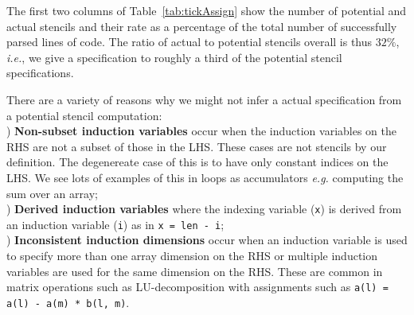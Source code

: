 \documentclass[9pt]{sigplanconf}
\theoremstyle{definition}
\newcommand{\ie}{\emph{i.e.}}
\newcommand{\eg}{\emph{e.g.}}
\begin{document}
The first two columns of Table~\ref{tab:tickAssign} show the number
of potential and actual stencils and their rate as a percentage of the
total number of successfully parsed lines of code. The ratio of
actual to potential stencils overall is thus $32\%$, \ie{}, we give
a specification to roughly a third of the potential stencil specifications.

There are a variety of reasons why we might not infer a actual specification from a potential
stencil computation: \\
) \textbf{Non-subset induction variables} occur when the
induction variables on the RHS are not a subset of those in the LHS. These
cases are not stencils by our definition. The degenereate case of this
is to have only constant indices on the LHS. We see lots of examples
of this in loops as accumulators \eg{} computing the sum over an array; \\
) \textbf{Derived induction variables} where the
indexing variable (\texttt{x}) is derived from an
induction variable (\texttt{i}) as in
\texttt{x = len - i};  \\
) \textbf{Inconsistent induction dimensions} occur when
an induction variable is used to specify more than one array dimension
on the RHS or multiple induction variables are used for the same
dimension on the RHS. These are common in matrix operations such as
LU-decomposition with assignments such as
\texttt{a(l) = a(l) - a(m) * b(l, m)}.



\end{document}
